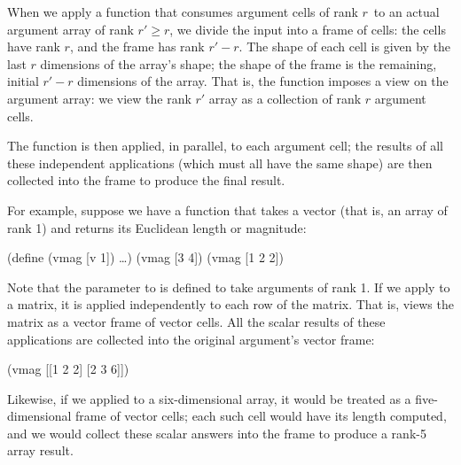 When we apply a function that consumes argument cells of rank $r\,$
to an actual argument array of rank $r' \geq r$,
we divide the input into a frame of cells:
the cells have rank $r$, and the frame has rank $r'-r$.
The shape of each cell is given by
the last $r$ dimensions of the array's shape;
the shape of the frame is the remaining, initial $r'-r$ dimensions
of the array.
That is, the function imposes a view on the argument array:
we view the rank $r'$ array as a collection of rank $r$ argument cells.

The function is then applied, in parallel, to each argument cell;
the results of all these independent applications
(which must all have the same shape)
are then collected into the frame to produce the final result.

For example, suppose we have a function  that takes a vector
(that is, an array of rank 1) and returns its Euclidean length or magnitude:
\begin{code}
    (define (vmag [v 1]) \ldots)
    (vmag [3 4])
    (vmag [1 2 2])
\end{code}

Note that the  parameter to  is defined to take arguments
of rank 1.
If we apply  to a matrix, it is applied independently to each
row of the matrix. That is,  views the matrix as a vector
frame of vector cells.
All the scalar results of these  applications are collected into
 the original argument's vector frame:
\begin{code}
    (vmag [[1 2 2]
           [2 3 6]])
\result{[3 7]}\end{code}

Likewise, if we applied  to a six-dimensional array,
it would be treated as a five-dimensional frame of vector cells;
each such cell would have its length computed,
and we would collect these scalar answers into the frame
to produce a rank-5 array result.


